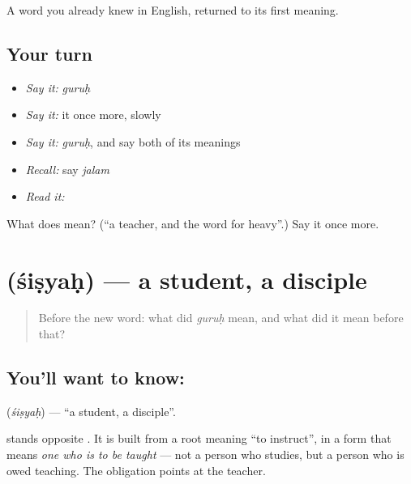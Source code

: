 \begin{grammarlens}[title={What you've built}]
A word you already knew in English, returned to its first meaning.
\end{grammarlens}

\subsection*{Your turn}
\begin{itemize}
\raggedright
  \item \emph{Say it:} \emph{guruḥ}
  \item \emph{Say it:} it once more, slowly
  \item \emph{Say it:} \emph{guruḥ}, and say both of its meanings
  \item \emph{Recall:} say \emph{jalam}
  \item \emph{Read it:} \textbf{}
\end{itemize}

\begin{tcolorbox}[breakable,colback=teal!4,colframe=teal!35!black,title={Before you move on}]
What does  mean? (\textquotedblleft{}a teacher, and the word for heavy\textquotedblright{}.) Say it once more.
\end{tcolorbox}
\section[\texorpdfstring{\sk{शिष्यः} (śiṣyaḥ)}{शिष्यः (śiṣyaḥ)}]{ (śiṣyaḥ) — a student, a disciple}

\label{lesson:SA-C26-student}



\begin{quote}
Before the new word: what did \emph{guruḥ} mean, and what did it mean before that?
\end{quote}

\subsection*{You'll want to know: }
\textbf{} (\emph{śiṣyaḥ}) — \textquotedblleft{}a student, a disciple\textquotedblright{}.

\textbf{} stands opposite . It is built from a root meaning \textquotedblleft{}to instruct\textquotedblright{}, in a form that means \emph{one who is to be taught} — not a person who studies, but a person who is owed teaching. The obligation points at the teacher.


